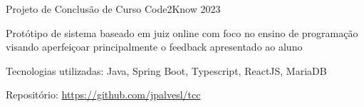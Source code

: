 
\begin{cventries}
    \cventry
    {Projeto de Conclusão de Curso} %
    {Code2Know} %
    {} %
    {2023} %
    { 
      \begin{cvitems} %
        \item {Protótipo de sistema baseado em juiz online com foco no ensino de programação visando aperfeiçoar principalmente o feedback apresentado ao aluno}
        \item {Tecnologias utilizadas: Java, Spring Boot, Typescript, ReactJS, MariaDB}
        \item {Repositório: \url{https://github.com/jpalvesl/tcc}}
      \end{cvitems}
    }
  
\end{cventries}